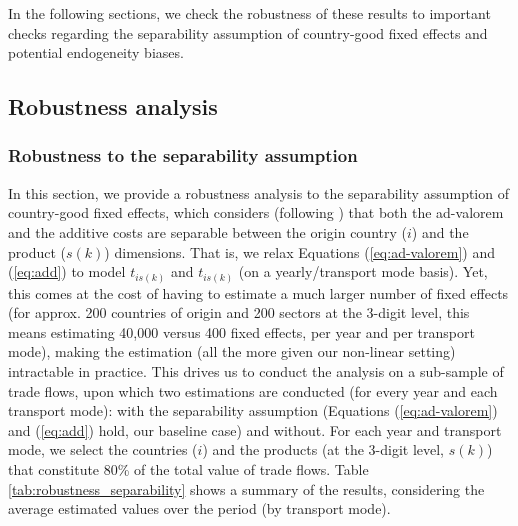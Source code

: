 \documentclass[a4paper,11pt]{article}
\begin{document}
In the following sections, we check the robustness of these results to important checks regarding the separability assumption of country-good fixed effects and potential endogeneity biases.

\subsection{Robustness analysis \label{sec:robustness}}


\subsubsection{Robustness to the separability assumption}
In this section, we provide a robustness analysis to the separability assumption of country-good fixed effects, which considers (following \citealp{Irrazabal_2015}) that both the ad-valorem and the additive costs are separable between the origin country ($i$) and the product ($s(k)$) dimensions.
That is, we relax Equations (\ref{eq:ad-valorem}) and (\ref{eq:add}) to model $t_{is(k)}$ and $t_{is(k)}$ (on a yearly/transport mode basis).
Yet, this comes at the cost of having to estimate a much larger number of fixed effects (for approx. 200 countries of origin and 200 sectors at the 3-digit level, this means estimating 40,000 versus 400 fixed effects, per year and per transport mode), making the estimation (all the more given our non-linear setting) intractable in practice.
This drives us to conduct the analysis on a sub-sample of trade flows, upon which two estimations are conducted (for every year and each transport mode): with the separability assumption (Equations (\ref{eq:ad-valorem}) and (\ref{eq:add}) hold, our baseline case) and without.
For each year and transport mode, we select the countries ($i$) and the products (at the 3-digit level, $s(k)$) that constitute 80\% of the total value of trade flows. Table \ref{tab:robustness_separability} shows a summary of the results, considering the average estimated values over the period (by transport mode).
\end{document}
